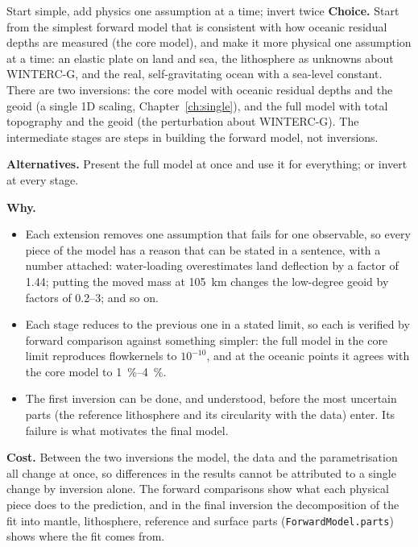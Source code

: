 \begin{decision}{Start simple, add physics one assumption at a time; invert twice}
\textbf{Choice.} Start from the simplest forward model that is consistent with how oceanic residual depths are measured (the core model), and make it more physical one assumption at a time: an elastic plate on land and sea, the lithosphere as unknowns about WINTERC-G, and the real, self-gravitating ocean with a sea-level constant.
There are two inversions: the core model with oceanic residual depths and the geoid (a single 1D scaling, Chapter~\ref{ch:single}), and the full model with total topography and the geoid (the perturbation about WINTERC-G).
The intermediate stages are steps in building the forward model, not inversions.

\textbf{Alternatives.} Present the full model at once and use it for everything; or invert at every stage.

\textbf{Why.}
\begin{itemize}[nosep]
\item Each extension removes one assumption that fails for one observable, so every piece of the model has a reason that can be stated in a sentence, with a number attached: water-loading overestimates land deflection by a factor of 1.44; putting the moved mass at \qty{105}{km} changes the low-degree geoid by factors of 0.2--3; and so on.
\item Each stage reduces to the previous one in a stated limit, so each is verified by forward comparison against something simpler: the full model in the core limit reproduces flowkernels to $10^{-10}$, and at the oceanic points it agrees with the core model to \qtyrange{1}{4}{\percent}.
\item The first inversion can be done, and understood, before the most uncertain parts (the reference lithosphere and its circularity with the data) enter. Its failure is what motivates the final model.
\end{itemize}
\textbf{Cost.} Between the two inversions the model, the data and the parametrisation all change at once, so differences in the results cannot be attributed to a single change by inversion alone.
The forward comparisons show what each physical piece does to the prediction, and in the final inversion the decomposition of the fit into mantle, lithosphere, reference and surface parts (\texttt{ForwardModel.parts}) shows where the fit comes from.
\end{decision}

